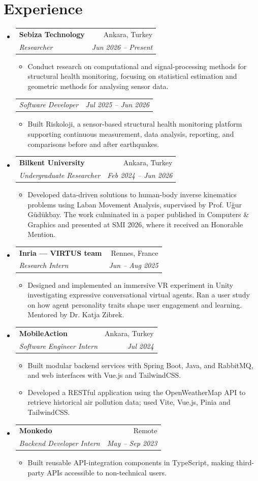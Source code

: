 \documentclass[letterpaper,11pt]{article}
\makeatletter
\newcommand{\resumeItemTitleless}[1]{
  \item\small{
    {#1 \vspace{-2pt}}
  }
}
\newcommand{\resumeEmployer}[3]{
  \vspace{-1pt}\item
    \begin{tabular*}{0.97\textwidth}{l@{\extracolsep{\fill}}r}
      \textbf{#1} & #2 \\
      #3
    \end{tabular*}\vspace{-5pt}
}
\newcommand{\resumeRole}[2]{
  \par\noindent
  \begin{tabular*}{0.97\textwidth}{l@{\extracolsep{\fill}}r}
    \textit{\small #1} & \textit{\small #2} \\
  \end{tabular*}\vspace{-5pt}
}
\newcommand{\resumeSubHeadingListStart}{\begin{itemize}[leftmargin=*]}
\newcommand{\resumeSubHeadingListEnd}{\end{itemize}}
\newcommand{\resumeItemListStart}{\begin{itemize}}
\newcommand{\resumeItemListEnd}{\end{itemize}\vspace{-5pt}}
\makeatother
\begin{document}
\section{Experience}
\resumeSubHeadingListStart
\resumeEmployer{Sebiza Technology}{Ankara, Turkey}{
\textit{\small Researcher} & \textit{\small Jun 2026 -- Present} \\
}
\resumeItemListStart
\resumeItemTitleless{Conduct research on computational and signal-processing methods for structural health monitoring, focusing on statistical estimation and geometric methods for analysing sensor data.}
\resumeItemListEnd
\resumeRole{Software Developer}{Jul 2025 -- Jun 2026}
\resumeItemListStart
\resumeItemTitleless{Built Riskoloji, a sensor-based structural health monitoring platform supporting continuous measurement, data analysis, reporting, and comparisons before and after earthquakes.}
\resumeItemListEnd
\resumeEmployer{Bilkent University}{Ankara, Turkey}{
\textit{\small Undergraduate Researcher} & \textit{\small Feb 2024 -- Jun 2026} \\
}
\resumeItemListStart
\resumeItemTitleless{Developed data-driven solutions to human-body inverse kinematics problems using Laban Movement Analysis, supervised by Prof. Uğur Güdükbay. The work culminated in a paper published in Computers \& Graphics and presented at SMI 2026, where it received an Honorable Mention.}
\resumeItemListEnd
\resumeEmployer{Inria --- VIRTUS team}{Rennes, France}{
\textit{\small Research Intern} & \textit{\small Jun -- Aug 2025} \\
}
\resumeItemListStart
\resumeItemTitleless{Designed and implemented an immersive VR experiment in Unity investigating expressive conversational virtual agents. Ran a user study on how agent personality traits shape user engagement and learning. Mentored by Dr. Katja Zibrek.}
\resumeItemListEnd
\resumeEmployer{MobileAction}{Ankara, Turkey}{
\textit{\small Software Engineer Intern} & \textit{\small Jul 2024} \\
}
\resumeItemListStart
\resumeItemTitleless{Built modular backend services with Spring Boot, Java, and RabbitMQ, and web interfaces with Vue.js and TailwindCSS.}
\resumeItemTitleless{Developed a RESTful application using the OpenWeatherMap API to retrieve historical air pollution data; used Vite, Vue.js, Pinia and TailwindCSS.}
\resumeItemListEnd
\resumeEmployer{Monkedo}{Remote}{
\textit{\small Backend Developer Intern} & \textit{\small May -- Sep 2023} \\
}
\resumeItemListStart
\resumeItemTitleless{Built reusable API-integration components in TypeScript, making third-party APIs accessible to non-technical users.}
\resumeItemListEnd
\resumeSubHeadingListEnd
\end{document}
